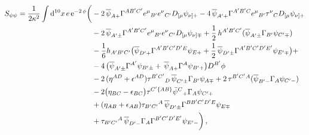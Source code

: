 \documentclass[a4paper,10pt,openany]{article}
\def\rme{\mathrm{e}}
\def\rmd{\mathrm{d}}
\begin{document}
	\begin{align} \label{eq:SNR4}
		S_{\psi\psi} = \frac{1}{2\kappa^2}\int \rmd^{10}x \,e\,\rme^{-2\,\phi}\bigg(&
		-2\,\overline{\psi}_{A+}\Gamma^{AB'C'}e^{\mu}{}_{B'}e^{\nu}{}_{C'}D_{[\mu}\psi_{\nu] +}-4\,\overline{\psi}_{A'+}\Gamma^{A'B'C}e^{\mu}{}_{B'}\tau^{\nu}{}_{C}D_{[\mu}\psi_{\nu] +}\nonumber\\
		&-2\,\overline{\psi}_{A'\pm}\Gamma^{A'B'C'}e^{\mu}{}_{B'}e^{\nu}{}_{C'}D_{[\mu}\psi_{\nu]
			\mp}+\frac{1}{2}\,h^{A'B'C'}(\overline{\psi}_{A'\pm}\Gamma_{B'}\psi_{C'\mp})\nonumber\\
		&-\frac{1}{6}h_{A'B'C'}\big(\overline{\psi}_{D'+}\Gamma^{A'B'C'D'E}\psi_{E+}+ \frac12\,\overline{\psi}_{D'\pm}\Gamma^{A'B'C'D'E'}\psi_{E'\mp}\big)+\nonumber\\
		&-4\,\big(\overline{\psi}_{A'\pm}\Gamma^{A'}\psi_{B'\pm}+\,\overline{\psi}_{A+}\Gamma^{A}\psi_{B'+}\big)D^{B'}\phi \nonumber\\
		&-2\,(\eta^{AD}+\epsilon^{AD})\tau^{B'C'}{}_D\,\overline{\psi}_{C'\pm}\Gamma_{B'}\psi_{A\mp} +2\,\tau^{B'C'}{}^A(\overline{\psi}_{B'-}\Gamma_{A}\psi_{C'-})\notag\\
		&- 2\big(\eta_{BC} -\epsilon_{BC}\big)\tau^{C'\{AB\}}\bar\psi^C{}_+\Gamma_A\psi_{C'+}\notag\\
		&+(\eta_{AB}+\epsilon_{AB})\tau_{B'C'}{}^A\,\overline{\psi}_{D'\pm}\Gamma^{BB'C'D'E}\psi_{E\mp}\nonumber\\
		&+\tau_{B'C'}{}^A\,\overline{\psi}_{D'-}\Gamma_A\Gamma^{B'C'D'E'}\psi_{E'-}\bigg)\,,
	\end{align}
\end{document}
